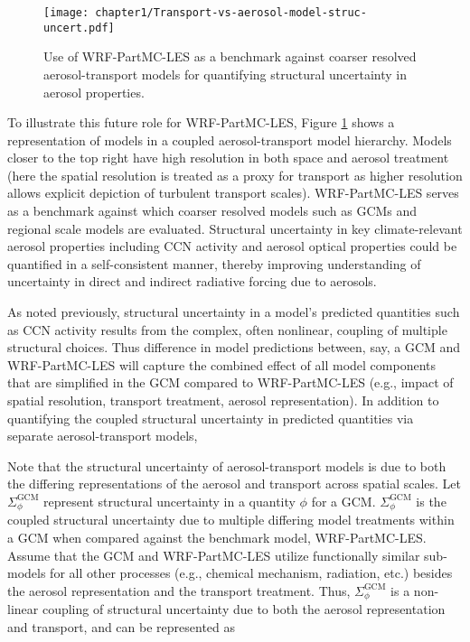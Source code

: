 \begin{figure}[!t]
	\centering
	\texttt{[image: chapter1/Transport-vs-aerosol-model-struc-uncert.pdf]}
	\caption{Use of WRF-PartMC-LES as a benchmark against coarser resolved aerosol-transport models for quantifying structural uncertainty in aerosol properties.}
	\label{fig:transport-vs-aerosol-model}
\end{figure} 

To illustrate this future role for WRF-PartMC-LES, Figure \ref{fig:transport-vs-aerosol-model} shows a representation of models in a coupled aerosol-transport model hierarchy. Models closer to the top right have high resolution in both space and aerosol treatment (here the spatial resolution is treated as a proxy for transport as higher resolution allows explicit depiction of turbulent transport scales). WRF-PartMC-LES serves as a benchmark against which coarser resolved models such as GCMs and regional scale models are evaluated. Structural uncertainty in key climate-relevant aerosol properties including CCN activity and aerosol optical properties could be quantified in a self-consistent manner, thereby improving understanding of uncertainty in direct and indirect radiative forcing due to aerosols.   

As noted previously, structural uncertainty in a model’s predicted quantities such as CCN activity results from the complex, often nonlinear, coupling of multiple structural choices. Thus difference in model predictions between, say, a GCM and WRF-PartMC-LES will capture the combined effect of all model components that are simplified in the GCM compared to WRF-PartMC-LES (e.g., impact of spatial resolution, transport treatment, aerosol representation). In addition to quantifying the coupled structural uncertainty in predicted quantities via separate aerosol-transport models,

Note that the structural uncertainty of aerosol-transport models is due to both the differing representations of the aerosol and transport across spatial scales. Let $\Sigma_{\phi}^{\text{GCM}}$ represent structural uncertainty in a quantity $\phi$ for a GCM. $\Sigma_{\phi}^{\text{GCM}}$ is the coupled structural uncertainty due to multiple differing model treatments within a GCM when compared against the benchmark model, WRF-PartMC-LES. Assume that the GCM and WRF-PartMC-LES utilize functionally similar sub-models for all other processes (e.g., chemical mechanism, radiation, etc.) besides the aerosol representation and the transport treatment. Thus, $\Sigma_{\phi}^{\text{GCM}}$ is a non-linear coupling of structural uncertainty due to both the aerosol representation and transport, and can be represented as

